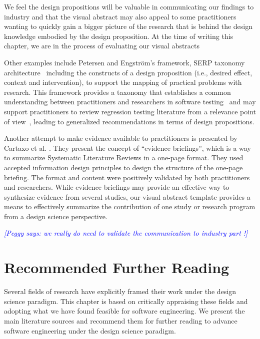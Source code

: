 \documentclass[graybox]{svmult}
\newcommand{\peggy}[1]{\textcolor{blue}{{\it [Peggy says: #1]}}}
\newcommand{\peggy}[1]{}
\begin{document}
We feel the design propositions will be valuable in communicating our findings to industry and that the visual abstract may also appeal to some practitioners wanting to quickly gain a bigger picture of the research that is behind the design knowledge embodied by the design proposition. 
At the time of writing this chapter, we are in the process of evaluating our visual abstracts

Other examples include Petersen and Engstr\"om's framework, SERP taxonomy architecture~\cite{petersen_finding_2014} including the constructs of a design proposition  
(i.e., desired effect, context and intervention), to support the mapping of practical problems with research. 
This framework provides a taxonomy that establishes a common understanding between practitioners and researchers in software testing~\cite{engstrom_SERP-test_2017} and may support practitioners to review regression testing literature from a relevance point of view~\cite{ali_search_2019}, leading to generalized recommendations in terms of design propositions. 

Another attempt to make evidence available to practitioners is presented by Cartaxo et al. \cite{Cartaxo2016}. 
They present the concept of ``evidence briefings'', which is a way to summarize Systematic Literature Reviews in a one-page format. 
They used accepted information design principles to design the structure of the one-page briefing. The format and content were positively validated by both practitioners and researchers. While evidence briefings may provide an effective way to synthesize evidence from several studies, our visual abstract template provides a means to effectively summarize the contribution of one study or research program from a design science perspective.

\peggy{we really do need to validate the communication to industry part !}



\section{Recommended Further Reading}
\label{sec:reading}
Several fields of research have explicitly framed their work under the design science paradigm. This chapter is based on critically appraising these fields and adopting what we have found feasible for software engineering. We present the main literature sources and recommend them for further reading to advance software engineering under the design science paradigm.
\end{document}
